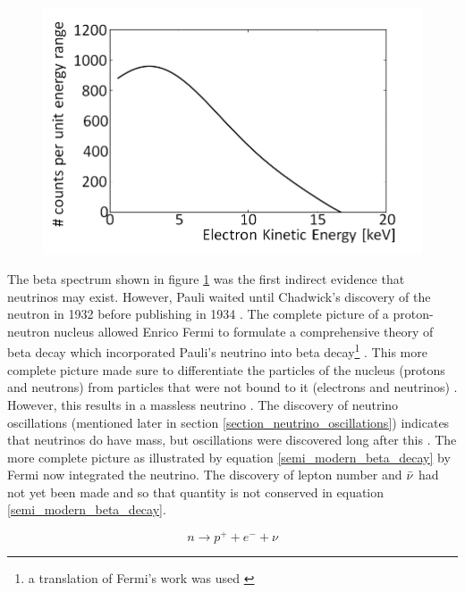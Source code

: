 \begin{figure}[!h]
 \centering
 \includegraphics[width=0.7\linewidth]{Chapter1/Figs/Raster/betaSpectrum.png}
 \label{fig:beta_spectrum}
\end{figure}

The beta spectrum shown in figure \ref{fig:beta_spectrum} was the first indirect evidence that neutrinos may exist. However, Pauli waited until Chadwick's discovery of the neutron in 1932 \cite{chadwick1932possible} before publishing in 1934 \cite{lederman1970resource}. The complete picture of a proton-neutron nucleus allowed Enrico Fermi to formulate a comprehensive theory of beta decay which incorporated Pauli's neutrino into beta decay\footnote{a translation of Fermi's work was used \cite{wilson1968fermi}} \cite{lederman1970resource} \cite{Fermi:1934hr}. This more complete picture made sure to differentiate the particles of the nucleus (protons and neutrons) from particles that were not bound to it (electrons and neutrinos) \cite{Fermi:1934hr} \cite{wilson1968fermi}. However, this results in a massless neutrino \cite{lederman1970resource}. The discovery of neutrino oscillations (mentioned later in section \ref{section_neutrino_oscillations}) indicates that neutrinos do have mass, but oscillations were discovered long after this  \cite{griffiths2008neutrino1.5}. The more complete picture as illustrated by equation \ref{semi_modern_beta_decay} by Fermi now integrated the neutrino. The discovery of lepton number and $\Bar{\nu}$ had not yet been made and so that quantity is not conserved in equation \ref{semi_modern_beta_decay}. 

\begin{equation}
    n \rightarrow p^+ + e^- + \nu
    \label{semi_modern_beta_decay}
\end{equation}

